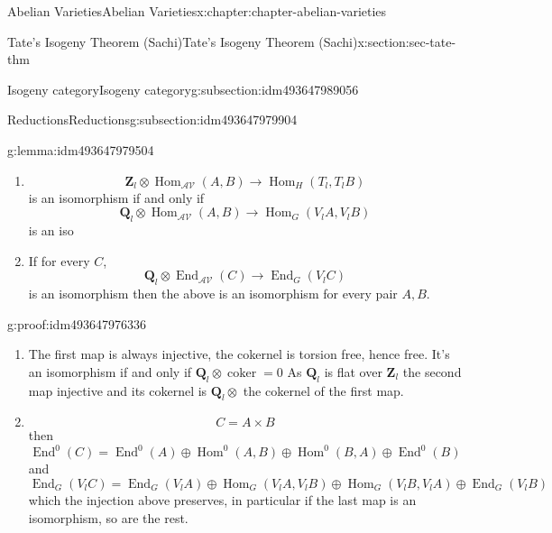 \documentclass[oneside,10pt,]{book}
\numberwithin{equation}{section}
\newcommand{\ZZ}{\mathbf{Z}}
\newcommand{\QQ}{\mathbf{Q}}
\newcommand{\cat}[1]{\mathcal{#1}}
\DeclareMathOperator{\coker}{coker}
\DeclareMathOperator{\End}{End}
\DeclareMathOperator{\Hom}{Hom}
\begin{document}
\begin{chapterptx}{Abelian Varieties}{}{Abelian Varieties}{}{}{x:chapter:chapter-abelian-varieties}
\begin{sectionptx}{Tate's Isogeny Theorem (Sachi)}{}{Tate's Isogeny Theorem (Sachi)}{}{}{x:section:sec-tate-thm}
\begin{subsectionptx}{Isogeny category}{}{Isogeny category}{}{}{g:subsection:idm493647989056}
\begin{enumerate}
\end{enumerate}
%
\end{subsectionptx}
%
%
\typeout{************************************************}
\typeout{************************************************}
%
\begin{subsectionptx}{Reductions}{}{Reductions}{}{}{g:subsection:idm493647979904}
\begin{lemma}{}{}{g:lemma:idm493647979504}%
%
\begin{enumerate}
\item{}%
\begin{equation*}
\ZZ_l \otimes \Hom_\cat{AV} (A,B) \to \Hom_H(T_l, T_lB)
\end{equation*}
is an isomorphism if and only if%
\begin{equation*}
\QQ_l \otimes \Hom_\cat{AV} (A,B) \to \Hom_G(V_l A, V_l B)
\end{equation*}
is an iso%
\item{}If for every \(C\),%
\begin{equation*}
\QQ_l \otimes \End_\cat{AV} (C) \to \End_G(V_l C)
\end{equation*}
is an isomorphism then the above is an isomorphism for every pair \(A,B\).%
\end{enumerate}
%
\end{lemma}
\begin{proofptx}{}{g:proof:idm493647976336}
%
\begin{enumerate}
\item{}The first map is always injective, the cokernel is torsion free, hence free. It's an isomorphism if and only if \(\QQ_l \otimes \coker = 0\) As \(\QQ_l\) is flat over \(\ZZ_l\) the second map injective and its cokernel is \(\QQ_l \otimes\) the cokernel of the first map.%
\item{}%
\begin{equation*}
C = A\times B
\end{equation*}
then%
\begin{equation*}
\End^0(C) = \End^0(A)\oplus \Hom^0(A,B) \oplus \Hom^0(B,A) \oplus \End^0(B)
\end{equation*}
and%
\begin{equation*}
\End_G(V_lC) = \End_G(V_lA)\oplus \Hom_G(V_lA,V_lB) \oplus \Hom_G(V_lB,V_lA) \oplus \End_G(V_lB)
\end{equation*}
which the injection above preserves, in  particular if the last map is an isomorphism, so are the rest.%
\end{enumerate}

\end{proofptx}
\end{subsectionptx}
\end{sectionptx}
\end{chapterptx}
\end{document}
